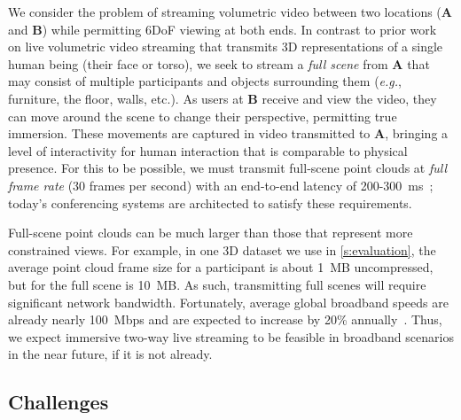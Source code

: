 We consider the problem of streaming volumetric video between two locations (\textbf{A} and \textbf{B}) while permitting 6DoF viewing at both ends.
%
In contrast to prior work~\cite{starline,farfetchfusion} on live volumetric video streaming that transmits 3D representations of a single human being (their face or torso), we seek to stream a \textit{full scene} from \textbf{A} that may consist of multiple participants and objects surrounding them (\textit{e.g.}, furniture, the floor, walls, etc.).
%
As users at \textbf{B} receive and view the video, they can move around the scene to change their perspective, permitting true immersion.
%
%
These movements are captured in video transmitted to \textbf{A}, bringing a level of interactivity for human interaction that is comparable to physical presence.
%
For this to be possible, we must transmit full-scene point clouds at \textit{full frame rate} (30 frames per second) with an end-to-end latency of 200-300~ms~\cite{videoconf-benchmark,salsify}; today's conferencing systems are architected to satisfy these requirements.

Full-scene point clouds can be much larger than those that represent more constrained views.
%
For example, in one 3D dataset we use in \cref{s:evaluation}, the average point cloud frame size for a participant is about 1~MB uncompressed, but for the full scene is 10~MB.
%
As such, transmitting full scenes will require significant network bandwidth.
%
Fortunately, average global broadband speeds are already nearly 100~Mbps and are expected to increase by 20\% annually~\cite{cisco_whitepaper}.
%
Thus, we expect immersive two-way live streaming to be feasible in broadband scenarios in the near future, if it is not already.


\subsection{Challenges}
\label{s:challenges}


